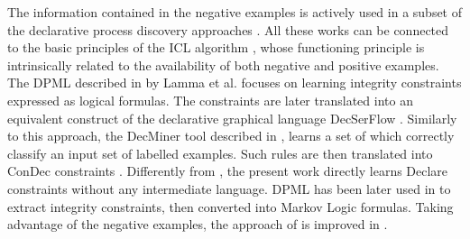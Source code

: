 The information contained in the negative examples is actively used in a subset of the declarative process discovery approaches \cite{2007-Lamma,2009-Chesani,2010-Bellodi,2016-Bellodi,slaats_weighing_2021}. All these works can be connected to the basic principles of the \ac{ICL} algorithm \cite{1995-DaRaedt}, whose functioning principle is intrinsically related to the availability of both negative and positive examples. 
The \ac{DPML} described in \cite{2007-Lamma, 2007b-Lamma} by Lamma et al. focuses on learning integrity constraints expressed as logical formulas. The constraints are later translated into an equivalent construct of the declarative graphical language DecSerFlow \cite{2006-Aalst}. Similarly to this approach, the DecMiner tool described in \cite{2009-Chesani}, learns a set of  \cite{2008-Alberti} which correctly classify an input set of labelled examples. Such rules are then translated into ConDec constraints \cite{2006-Pesic}. Differently from \cite{2009-Chesani}, the present work directly learns Declare constraints without any intermediate language.
\ac{DPML} has been later used in \cite{2010-Bellodi} to extract integrity constraints, then converted into Markov Logic formulas. %
Taking advantage of the negative examples, the approach of \cite{2010-Bellodi}  is improved in \cite{2016-Bellodi}. %
%
